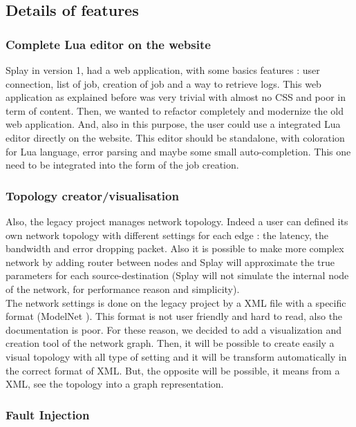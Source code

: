\documentclass{eplmastersthesis}
\begin{document}
\subsection{Details of features}

\subsubsection{Complete Lua editor on the website}

Splay in version 1, had a web application, with some basics features : user connection, list of job, creation of job and a way to retrieve logs. This web application as explained before was very trivial with almost no CSS and poor in term of content. Then, we wanted to refactor completely and modernize the old web application. And, also in this purpose, the user could use a integrated Lua editor directly on the website. This editor should be standalone, with coloration for Lua language, error parsing and maybe some small auto-completion. This one need to be integrated into the form of the job creation.

\subsubsection{Topology creator/visualisation}

Also, the legacy project manages network topology. Indeed a user can defined its own network topology with different settings for each edge : the latency, the bandwidth and error dropping packet. Also it is possible to make more complex network by adding router between nodes and Splay will approximate the true parameters for each source-destination (Splay will not simulate the internal node of the network, for performance reason and simplicity). \\

The network settings is done on the legacy project by a XML file with a specific format (ModelNet \cite{ModelNet}). This format is not user friendly and hard to read, also the documentation is poor. For these reason, we decided to add a visualization and creation tool of the network graph. Then, it will be possible to create easily a visual topology with all type of setting and it will be transform automatically in the correct format of XML. But, the opposite will be possible, it means from a XML, see the topology into a graph representation. 

\subsubsection{Fault Injection}
\end{document}

